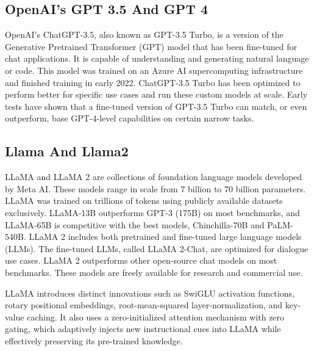 \begin{spacing}{1.5}
\begin{sloppypar}
\subsection{OpenAI's GPT 3.5 And GPT 4}
OpenAI's ChatGPT-3.5, also known as GPT-3.5 Turbo, is a version of the Generative Pretrained Transformer (GPT) model that has been fine-tuned for chat applications. It is capable of understanding and generating natural language or code. This model was trained on an Azure AI supercomputing infrastructure and finished training in early 2022.
ChatGPT-3.5 Turbo has been optimized to perform better for specific use cases and run these custom models at scale. Early tests have shown that a fine-tuned version of GPT-3.5 Turbo can match, or even outperform, base GPT-4-level capabilities on certain narrow tasks. \cite{bahrini2023chatgpt}

\subsection{Llama And Llama2}
LLaMA and LLaMA 2 are collections of foundation language models developed by Meta AI. These models range in scale from 7 billion to 70 billion parameters.
LLaMA \cite{touvron2023llama} was trained on trillions of tokens using publicly available datasets exclusively. LLaMA-13B outperforms GPT-3 (175B) on most benchmarks, and LLaMA-65B is competitive with the best models, Chinchilla-70B and PaLM-540B.
LLaMA 2 \cite{touvron2023llama2} includes both pretrained and fine-tuned large language models (LLMs). The fine-tuned LLMs, called LLaMA 2-Chat, are optimized for dialogue use cases. LLaMA 2 outperforms other open-source chat models on most benchmarks.
These models are freely available for research and commercial use.

LLaMA introduces distinct innovations such as SwiGLU activation functions, rotary positional embeddings, root-mean-squared layer-normalization, and key-value caching. It also uses a zero-initialized attention mechanism with zero gating, which adaptively injects new instructional cues into LLaMA while effectively preserving its pre-trained knowledge.


\end{sloppypar}
\end{spacing}

